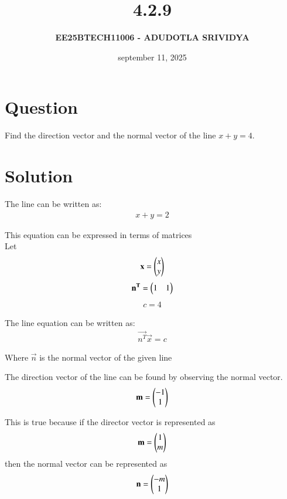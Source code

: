 \documentclass[journal]{IEEEtran}
\title{\textbf{4.2.9}}
\author{\textbf{EE25BTECH11006 - ADUDOTLA SRIVIDYA}}
\date{september 11, 2025}
\begin{document}
\maketitle

\section*{\textbf{Question}}
Find the direction vector and the normal vector of the line $x + y = 4$.

\section*{\textbf{Solution}}

The line can be written as: 
\begin{align}
x + y = 2
\end{align}

This equation can be expressed in terms of matrices\\
Let
\begin{align}
\mathbf{x} = \begin{pmatrix}x \\ y\end{pmatrix}
\end{align}
\begin{align}
\mathbf{n^T} = \begin{pmatrix}1 & 1\end{pmatrix}
\end{align}
\begin{align}
c = 4
\end{align}

The line equation can be written as:
\begin{align}
\vec{n^T}  \vec{x} = c
\end{align}

Where $\vec{n}$ is the normal vector of the given line

The direction vector of the line can be found by observing the normal vector.
\begin{align}
\mathbf{m} = \begin{pmatrix}-1 \\ 1\end{pmatrix}
\end{align}



This is true because if the director vector is represented as 
\begin{align}
\mathbf{m}  = \begin{pmatrix}1 \\ m\end{pmatrix}    
\end{align}
then the normal vector can be represented as 
\begin{align}
\mathbf{n} = \begin{pmatrix}-m \\ 1\end{pmatrix}
\end{align}
\end{document}
